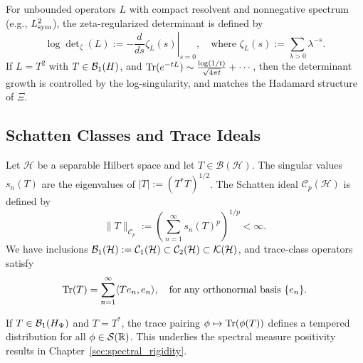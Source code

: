 For unbounded operators \( L \) with compact resolvent and nonnegative spectrum (e.g., \( L_{\mathrm{sym}}^2 \)), the zeta-regularized determinant is defined by
\[
\log \det\nolimits_\zeta(L) := - \left. \frac{d}{ds} \zeta_L(s) \right|_{s=0}, \quad \text{where } \zeta_L(s) := \sum_{\lambda > 0} \lambda^{-s}.
\]
If \( L = T^2 \) with \( T \in \mathcal{B}_1(H) \), and \( \operatorname{Tr}(e^{-tL}) \sim \frac{\log(1/t)}{\sqrt{4\pi t}} + \cdots \), then the determinant growth is controlled by the log-singularity, and matches the Hadamard structure of \( \Xi \).

\subsection*{Schatten Classes and Trace Ideals}

Let \( \mathcal{H} \) be a separable Hilbert space and let \( T \in \mathcal{B}(\mathcal{H}) \). The singular values \( s_n(T) \) are the eigenvalues of \( |T| := (T^*T)^{1/2} \). The Schatten ideal \( \mathcal{C}_p(\mathcal{H}) \) is defined by
\[
\|T\|_{\mathcal{C}_p} := \left( \sum_{n=1}^\infty s_n(T)^p \right)^{1/p} < \infty.
\]
We have inclusions \( \mathcal{B}_1(\mathcal{H}) := \mathcal{C}_1(\mathcal{H}) \subset \mathcal{C}_2(\mathcal{H}) \subset \mathcal{K}(\mathcal{H}) \), and trace-class operators satisfy
\[
\operatorname{Tr}(T) = \sum_{n=1}^\infty \langle T e_n, e_n \rangle, \quad \text{for any orthonormal basis } \{ e_n \}.
\]

If \( T \in \mathcal{B}_1(H_{\Psi}) \) and \( T = T^* \), the trace pairing \( \phi \mapsto \operatorname{Tr}(\phi(T)) \) defines a tempered distribution for all \( \phi \in \mathcal{S}(\mathbb{R}) \). This underlies the spectral measure positivity results in Chapter~\ref{sec:spectral_rigidity}.

